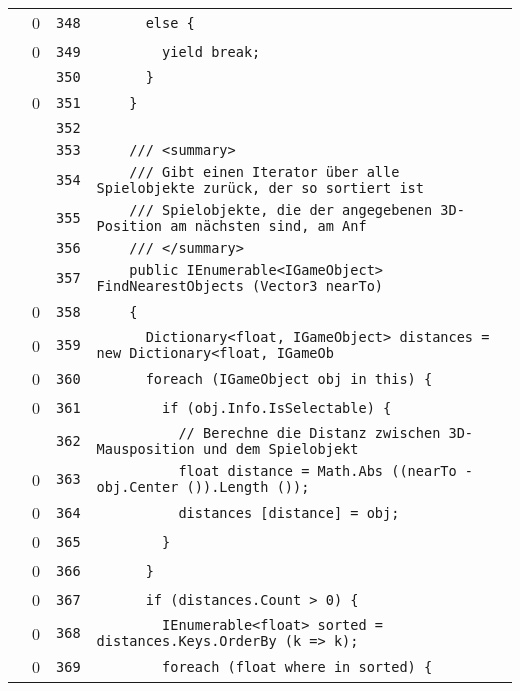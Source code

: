\documentclass[a4paper,10pt]{article}
\begin{document}
\begin{longtable}[l]{lrrl}
\cellcolor{red} & 0 & \verb~348~ & \verb~      else {~\\
\cellcolor{red} & 0 & \verb~349~ & \verb~        yield break;~\\
\cellcolor{gray} &  & \verb~350~ & \verb~      }~\\
\cellcolor{red} & 0 & \verb~351~ & \verb~    }~\\
\cellcolor{gray} &  & \verb~352~ & \verb~~\\
\cellcolor{gray} &  & \verb~353~ & \verb~    /// <summary>~\\
\cellcolor{gray} &  & \verb~354~ & \verb~    /// Gibt einen Iterator über alle Spielobjekte zurück, der so sortiert ist~\\
\cellcolor{gray} &  & \verb~355~ & \verb~    /// Spielobjekte, die der angegebenen 3D-Position am nächsten sind, am Anf~\\
\cellcolor{gray} &  & \verb~356~ & \verb~    /// </summary>~\\
\cellcolor{gray} &  & \verb~357~ & \verb~    public IEnumerable<IGameObject> FindNearestObjects (Vector3 nearTo)~\\
\cellcolor{red} & 0 & \verb~358~ & \verb~    {~\\
\cellcolor{red} & 0 & \verb~359~ & \verb~      Dictionary<float, IGameObject> distances = new Dictionary<float, IGameOb~\\
\cellcolor{red} & 0 & \verb~360~ & \verb~      foreach (IGameObject obj in this) {~\\
\cellcolor{red} & 0 & \verb~361~ & \verb~        if (obj.Info.IsSelectable) {~\\
\cellcolor{gray} &  & \verb~362~ & \verb~          // Berechne die Distanz zwischen 3D-Mausposition und dem Spielobjekt~\\
\cellcolor{red} & 0 & \verb~363~ & \verb~          float distance = Math.Abs ((nearTo - obj.Center ()).Length ());~\\
\cellcolor{red} & 0 & \verb~364~ & \verb~          distances [distance] = obj;~\\
\cellcolor{red} & 0 & \verb~365~ & \verb~        }~\\
\cellcolor{red} & 0 & \verb~366~ & \verb~      }~\\
\cellcolor{red} & 0 & \verb~367~ & \verb~      if (distances.Count > 0) {~\\
\cellcolor{red} & 0 & \verb~368~ & \verb~        IEnumerable<float> sorted = distances.Keys.OrderBy (k => k);~\\
\cellcolor{red} & 0 & \verb~369~ & \verb~        foreach (float where in sorted) {~\\

\end{longtable}
\end{document}
